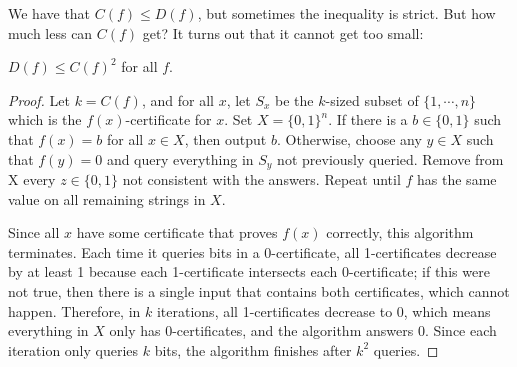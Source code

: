 We have that $C(f) \le D(f)$, but sometimes the inequality is strict. But how much less can $C(f)$ get? It turns out that it cannot get too small:

\begin{theorem}
$D(f) \le C(f)^2$ for all $f$.
\end{theorem}

\begin{proof}
Let $k = C(f)$, and for all $x$, let $S_x$ be the $k$-sized subset of $\{1, \cdots, n\}$ which is the $f(x)$-certificate for $x$. Set $X = \{0, 1\}^n$. If there is a $b \in \{0, 1\}$ such that $f(x) = b$ for all $x \in X$, then output $b$. Otherwise, choose any $y \in X$ such that $f(y) = 0$ and query everything in $S_y$ not previously queried. Remove from X every $z \in \{0, 1\}$ not consistent with the answers. Repeat until $f$ has the same value on all remaining strings in $X$. 

\par Since all $x$ have some certificate that proves $f(x)$ correctly, this algorithm terminates. Each time it queries bits in a 0-certificate, all 1-certificates decrease by at least 1 because each 1-certificate intersects each 0-certificate; if this were not true, then there is a single input that contains both certificates, which cannot happen. Therefore, in $k$ iterations, all 1-certificates decrease to 0, which means everything in $X$ only has 0-certificates, and the algorithm answers 0. Since each iteration only queries $k$ bits, the algorithm finishes after $k^2$ queries.
\end{proof}